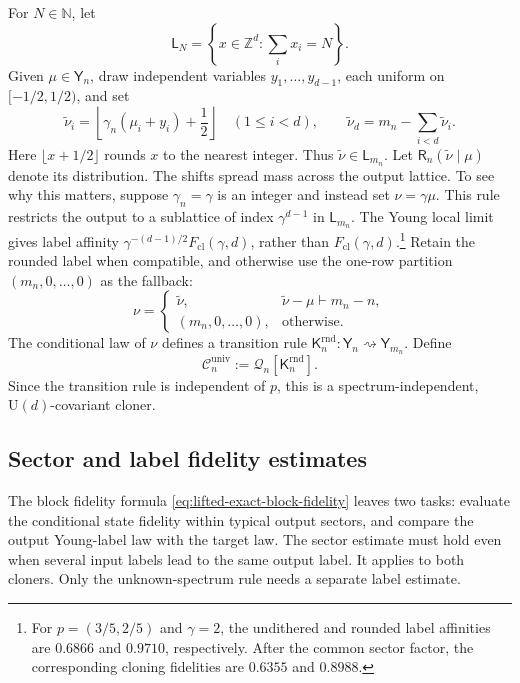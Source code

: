 \documentclass[11pt]{article}
\theoremstyle{remark}
\theoremstyle{plain}
\newcommand{\cC}{\mathcal C}
\newcommand{\U}{\mathrm U}
\newcommand{\Fcl}{F_{\mathrm{cl}}}
\begin{document}
For \(N\in\mathbb N\), let
\[
  \mathsf L_N=\left\{x\in\mathbb Z^d:\sum_i x_i=N\right\}.
\]
Given \(\mu\in\mathsf Y_n\), draw independent variables
\(y_1,\ldots,y_{d-1}\), each uniform on \([-1/2,1/2)\), and set
\begin{equation}\label{eq:randomized-rounding}
  \widetilde\nu_i
  =\left\lfloor\gamma_n(\mu_i+y_i)+\frac12\right\rfloor
  \quad(1\le i<d),
  \qquad
  \widetilde\nu_d=m_n-\sum_{i<d}\widetilde\nu_i.
\end{equation}
Here \(\lfloor x+1/2\rfloor\) rounds \(x\) to the nearest integer.
Thus \(\widetilde\nu\in\mathsf L_{m_n}\).  Let
\(\mathsf R_n(\widetilde\nu\mid\mu)\) denote its distribution.
The shifts spread mass across the output lattice.  To see why this matters,
suppose \(\gamma_n=\gamma\) is an integer and instead set \(\nu=\gamma\mu\).
This rule restricts the output to a sublattice of index
\(\gamma^{d-1}\) in \(\mathsf L_{m_n}\).
The Young local limit gives label affinity
\(\gamma^{-(d-1)/2}\Fcl(\gamma,d)\), rather than
\(\Fcl(\gamma,d)\).\footnote{For \(p=(3/5,2/5)\) and \(\gamma=2\),
the undithered and rounded label affinities are \(0.6866\) and \(0.9710\),
respectively.  After the common sector factor, the corresponding cloning
fidelities are \(0.6355\) and \(0.8988\).}
Retain the rounded label when compatible, and otherwise
use the one-row partition \((m_n,0,\ldots,0)\) as the fallback:
\begin{equation}\label{eq:rounding-kernel}
  \nu=
  \begin{cases}
    \widetilde\nu,&\widetilde\nu-\mu\vdash m_n-n,\\[1mm]
    (m_n,0,\ldots,0),&\text{otherwise}.
  \end{cases}
\end{equation}
The conditional law of \(\nu\) defines a transition rule
\(\mathsf K_n^{\mathrm{rnd}}:\mathsf Y_n\rightsquigarrow\mathsf Y_{m_n}\).
Define
\begin{equation}\label{eq:universal-cloner-definition}
  \cC_n^{\mathrm{univ}}:=\mathcal Q_n[\mathsf K_n^{\mathrm{rnd}}].
\end{equation}
Since the transition rule is independent of \(p\), this is a spectrum-independent,
\(\U(d)\)-covariant cloner.

\subsection{Sector and label fidelity estimates}
\label{sec:uniform-estimates-achievability}

The block fidelity formula \eqref{eq:lifted-exact-block-fidelity} leaves two
tasks: evaluate the conditional state fidelity within typical output
sectors, and compare the output Young-label law with the target law.  The
sector estimate must hold even when several input labels lead to the same
output label.  It applies to both cloners.  Only the unknown-spectrum rule
needs a separate label estimate.
\end{document}
